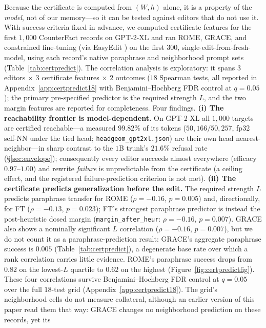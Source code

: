 \documentclass[10pt,twocolumn]{article}
\theoremstyle{remark}
\begin{document}
Because the certificate is computed from $(W,h)$ alone, it is a property of the
\emph{model}, not of our memory---so it can be tested against editors that do not
use it. With success criteria fixed in advance, we computed certificate features
for the first $1{,}000$ CounterFact records \citep{meng2022rome} on GPT-2-XL and
ran ROME, GRACE, and constrained fine-tuning (via EasyEdit
\citep{wang2023easyedit}) on the first $300$, single-edit-from-fresh-model, using
each record's native paraphrase and neighborhood prompt sets
(Table~\ref{tab:certpredict}). The correlation analysis is exploratory: it spans
$3$ editors $\times$ $3$ certificate features $\times$ $2$ outcomes ($18$
Spearman tests, all reported in Appendix~\ref{app:certpredict18} with
Benjamini--Hochberg FDR control at $q=0.05$); the primary pre-specified
predictor is the required strength $L$, and the two margin features are
reported for completeness. Four findings.
\textbf{(i) The reachability frontier is model-dependent.} On GPT-2-XL all
$1{,}000$ targets are certified reachable---a measured $99.82\%$ of its tokens
($50{,}166/50{,}257$, fp32 self-NN under the tied head;
\texttt{headgeom\_gpt2xl.json}) are their own
head nearest-neighbor---in sharp contrast to the $1$B trunk's $21.6\%$ refusal
rate (\S\ref{sec:envelope}); consequently every editor succeeds almost everywhere
(efficacy $0.97$--$1.00$) and rewrite \emph{failure} is unpredictable from the
certificate (a ceiling effect, and the registered failure-prediction criterion is
not met).
\textbf{(ii) The certificate predicts generalization before the edit.} The
required strength $L$ predicts paraphrase transfer for ROME
($\rho=-0.16$, $p=0.005$) and, directionally, for FT ($\rho=-0.13$, $p=0.023$);
FT's strongest paraphrase predictor is instead the post-heuristic dosed margin
(\texttt{margin\_after\_heur}: $\rho=-0.16$, $p=0.007$). GRACE also shows a
nominally significant $L$ correlation ($\rho=-0.16$, $p=0.007$), but we do not
count it as a paraphrase-prediction result: GRACE's aggregate paraphrase
success is $0.005$ (Table~\ref{tab:certpredict}), a degenerate base rate over
which a rank correlation carries little evidence. ROME's paraphrase success
drops from $0.82$ on the lowest-$L$ quartile to $0.62$ on the highest
(Figure~\ref{fig:certpredictfig}). These four correlations survive
Benjamini--Hochberg FDR control at $q=0.05$ over the full $18$-test grid
(Appendix~\ref{app:certpredict18}). The grid's neighborhood cells do not
measure collateral, although an earlier version of this paper read them that
way: GRACE changes no neighborhood prediction on these records, yet its
\end{document}
